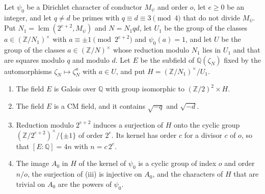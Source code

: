 \begin{proposition}\label{field}
Let $\psi_0$ be a Dirichlet character of conductor $M_\psi$ and order $o$, let $e\ge0$ be an integer, and let $q\ne d$ be primes with $q\equiv d\equiv3\pmod4$ that do not divide $M_\psi$. Put $N_1=\operatorname{lcm}(2^{e+2},M_\psi)$ and $N=N_1qd$, let $U_1$ be the group of the classes $a\in(\mathbb Z/N_1)^\times$ with $a\equiv\pm1\pmod{2^{e+2}}$ and $\psi_0(a)=1$, and let $U$ be the group of the classes $a\in(\mathbb Z/N)^\times$ whose reduction modulo $N_1$ lies in $U_1$ and that are squares modulo $q$ and modulo $d$. Let $E$ be the subfield of $\mathbb Q(\zeta_N)$ fixed by the automorphisms $\zeta_N\mapsto\zeta_N^a$ with $a\in U$, and put $H=(\mathbb Z/N_1)^\times/U_1$.
\begin{enumerate}
\item[(i)] The field $E$ is Galois over $\mathbb Q$ with group isomorphic to $(\mathbb Z/2)^2\times H$.
\item[(ii)] The field $E$ is a CM field, and it contains $\sqrt{-q}$ and $\sqrt{-d}$.
\item[(iii)] Reduction modulo $2^{e+2}$ induces a surjection of $H$ onto the cyclic group $(\mathbb Z/2^{e+2})^\times/\{\pm1\}$ of order $2^e$. Its kernel has order $c$ for a divisor $c$ of $o$, so that $[E:\mathbb Q]=4n$ with $n=c\,2^e$.
\item[(iv)] The image $A_0$ in $H$ of the kernel of $\psi_0$ is a cyclic group of index $o$ and order $n/o$, the surjection of (iii) is injective on $A_0$, and the characters of $H$ that are trivial on $A_0$ are the powers of $\psi_0$.
\end{enumerate}
\end{proposition}

